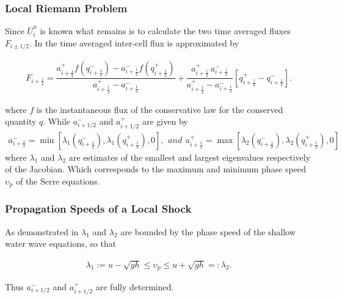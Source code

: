 \documentclass[SingleSpace,12pt]{Serre_ASCE}
\begin{document}
\subsubsection{Local Riemann Problem} %
Since $\bar{U}^{n}_i$ is known what remains is to calculate the two time  averaged fluxes $F_{i \pm 1/2}$. In  the time averaged inter-cell flux is approximated by
\begin{linenomath*}
\begin{gather}\label{eq:HLL_flux}
F_{i+\frac{1}{2}} = \dfrac{a^+_{i+\frac{1}{2}} f\left(q^-_{i+\frac{1}{2}}\right) - a^-_{i+\frac{1}{2}} f\left(q^+_{i+\frac{1}{2}}\right)}{a^+_{i+\frac{1}{2}} - a^-_{i+\frac{1}{2}}}  + \dfrac{a^+_{i+\frac{1}{2}} \, a^-_{i+\frac{1}{2}}}{a^+_{i+\frac{1}{2}} - a^-_{i+\frac{1}{2}}} \left [ q^+_{i+\frac{1}{2}} - q^-_{i+\frac{1}{2}} \right ].
\end{gather}
\end{linenomath*}
where $f$ is the instantaneous flux of the conservative law for the conserved quantity $q$. While $a^-_{i+1/2}$ and $a^+_{i+1/2}$ are given by
\begin{subequations}
\begin{gather}
a^-_{i+\frac{1}{2}} = \min \left[\lambda_1\left(q^-_{i + \frac{1}{2}}\right), \lambda_1\left(q^+_{i + \frac{1}{2}}\right), 0 \right],
\label{eq:aatcelledgep}
\end{gather}
and
\begin{gather}
a^+_{i+\frac{1}{2}} = \max \left[\lambda_2\left(q^-_{i + \frac{1}{2}}\right), \lambda_2\left(q^+_{i + \frac{1}{2}}\right), 0 \right]
\label{eq:aatcelledgem}
\end{gather}
\end{subequations}
where $\lambda_1$ and $\lambda_2$ are estimates of the smallest and largest eigenvalues respectively of the Jacobian. Which corresponds to the maximum and minimum phase speed $\upsilon_p$ of the Serre equations.
\subsubsection{Propagation Speeds of a Local Shock} %
As demonstrated in  $\lambda_1$ and $\lambda_2$ are bounded by the phase speed of the shallow water wave equations, so that
\begin{linenomath*}
\begin{gather}
 \lambda_1 := u - \sqrt{gh} \le \upsilon_p \le u + \sqrt{gh} =: \lambda_2.
\end{gather}
\end{linenomath*}
Thus $a^-_{i+1/2}$ and $a^+_{i+1/2}$ are fully determined.
\end{document}
